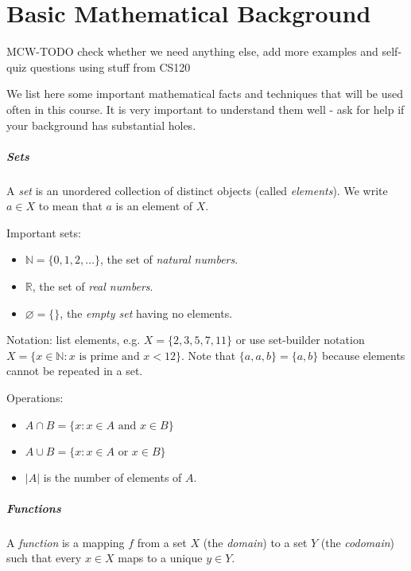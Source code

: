 \setcounter{chapter}{-1}
\chapter{Basic Mathematical Background}
\label{ch:app:mathtools}

MCW-TODO check whether we need anything else, add more examples and self-quiz questions using stuff from CS120

We list here some important mathematical facts and techniques  that will be used often in this course. It is very important to understand them well - ask for help if your background has substantial holes.

\paragraph{Sets}

A \emph{set} is an unordered collection of distinct objects (called \emph{elements}). We write $a\in X$ to mean that $a$ is an element of $X$.

Important sets: 
\begin{itemize}
\item $\mathbb{N} = \{0,1,2,\dots \}$, the set of \emph{natural numbers}.
\item $\mathbb{R}$, the set of \emph{real numbers}.
\item $\varnothing = \{\}$, the \emph{empty set} having no elements.
\end{itemize}

Notation: list elements, e.g. $X = \{2,3,5,7,11\}$ or use set-builder notation $X = \{x\in \mathbb{N} : \text{$x$ is prime and $x< 12$}\}$. Note that $\{a, a, b\} = \{a, b\}$ because elements cannot be repeated in a set.

Operations: 
\begin{itemize}
\item $A\cap B = \{x: x\in A \text{ and } x\in B\}$
\item $A\cup B = \{x: x\in A \text{ or  } x\in B\}$
\item $|A|$ is the number of elements of $A$.
\end{itemize}


\paragraph{Functions}

A \emph{function} is a mapping $f$ from a set $X$ (the \emph{domain}) to a set $Y$ (the \emph{codomain}) such that every $x\in X$ maps to a unique $y\in Y$.

